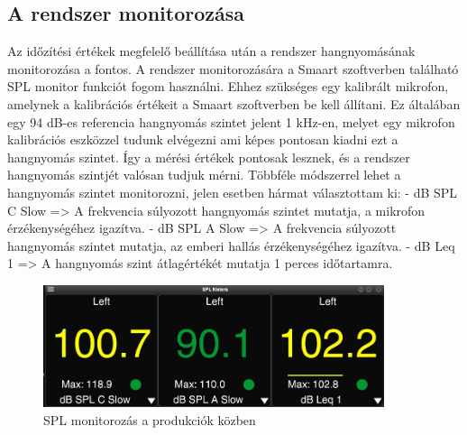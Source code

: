 \subsection{A rendszer monitorozása}
Az időzítési értékek megfelelő beállítása után a rendszer hangnyomásának monitorozása a fontos.
A rendszer monitorozására a Smaart szoftverben található SPL monitor funkciót fogom használni.
Ehhez szükséges egy kalibrált mikrofon, amelynek a kalibrációs értékeit a Smaart szoftverben be kell állítani. 
Ez általában egy 94 dB-es referencia hangnyomás szintet jelent 1 kHz-en, melyet egy mikrofon kalibrációs eszközzel tudunk elvégezni ami képes pontosan kiadni ezt a hangnyomás szintet.
Így a mérési értékek pontosak lesznek, és a rendszer hangnyomás szintjét valósan tudjuk mérni.
Többféle módszerrel lehet a hangnyomás szintet monitorozni, jelen esetben hármat választottam ki:
- dB SPL C Slow => A frekvencia súlyozott hangnyomás szintet mutatja, a mikrofon érzékenységéhez igazítva.
- dB SPL A Slow => A frekvencia súlyozott hangnyomás szintet mutatja, az emberi hallás érzékenységéhez igazítva.
- dB Leq 1 => A hangnyomás szint átlagértékét mutatja 1 perces időtartamra.
\begin{figure}[H]
	\centering
	\includegraphics[width=100mm, keepaspectratio]{figures/smaart_spl_meter.jpg}
	\caption{SPL monitorozás a produkciók közben}\label{fig:smaart_spl_meter}
\end{figure}
